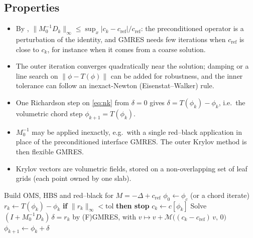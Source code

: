 \documentclass[11pt,a4paper]{article}
\theoremstyle{remark}\newtheorem{remark}{Remark}
\newcommand{\cR}{c_{\mathrm{ref}}}
\newcommand{\SolveM}{\mathcal{M}}
\begin{document}
\subsection{Properties}
\begin{itemize}
  \item By , $\|M_0^{-1}D_k\|_\infty\le\sup_x|c_k-\cR|/\cR$:
    the preconditioned operator is a perturbation of the identity, and GMRES
    needs few iterations when $\cR$ is close to $c_k$, for instance when it comes from a coarse
    solution.
  \item The outer iteration converges quadratically near the solution; damping
    or a line search on $\|\phi-T(\phi)\|$ can be added for robustness, and the
    inner tolerance can follow an inexact-Newton (Eisenstat--Walker) rule.
  \item One Richardson step on \eqref{eq:nk} from $\delta=0$ gives
    $\delta=T(\phi_k)-\phi_k$, i.e.\ the volumetric chord step $\phi_{k+1}=T(\phi_k)$.
  \item $M_0^{-1}$ may be applied inexactly, e.g.\ with a single red--black
    application in place of the preconditioned interface GMRES. The outer
    Krylov method is then flexible GMRES.
  \item Krylov vectors are volumetric fields, stored on a non-overlapping set
    of leaf grids (each point owned by one slab).
\end{itemize}

\begin{algorithm}[h]
\caption{Newton--Krylov with a shared preconditioner}\label{alg:nk}
\begin{algorithmic}[1]
\State Build OMS, HBS and red--black for $M=-\Delta+\cR$ 
\State $\phi_0\gets\phi_c$ (or a chord iterate)
  \State $r_k\gets T(\phi_k)-\phi_k$ \Comment{one $\SolveM$}
  \State \textbf{if} $\|r_k\|_\infty<\mathrm{tol}$ \textbf{then stop}
  \State $c_k\gets c[\phi_k]$
  \State Solve $(I+M_0^{-1}D_k)\,\delta=r_k$ by (F)GMRES, with
         $v\mapsto v+\SolveM\big((c_k-\cR)\,v,\,0\big)$
  \State $\phi_{k+1}\gets\phi_k+\delta$
\EndFor
\end{algorithmic}
\end{algorithm}

\end{document}
